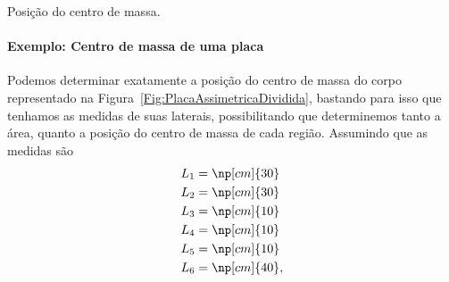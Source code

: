\begin{marginfigure}
\centering
{}
\caption{Posição do centro de massa. \label{Fig:CMBarrasFinasComCM}}
\end{marginfigure}

\paragraph{Exemplo: Centro de massa de uma placa}

Podemos determinar exatamente a posição do centro de massa do corpo representado na Figura~\ref{Fig:PlacaAssimetricaDividida}, bastando para isso que tenhamos as medidas de suas laterais, possibilitando que determinemos tanto a área, quanto a posição do centro de massa de cada região. Assumindo que as medidas são
\begin{align}
    L_1 &= \np[cm]{30} \\
    L_2 &= \np[cm]{30} \\
    L_3 &= \np[cm]{10} \\
    L_4 &= \np[cm]{10} \\
    L_5 &= \np[cm]{10} \\
    L_6 &= \np[cm]{40},
\end{align}

